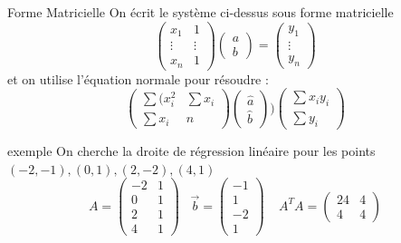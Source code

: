         \begin{parag}{Forme Matricielle}
            On écrit le système ci-dessus sous forme matricielle 
            \[\begin{pmatrix}
                x_1  & 1 \\ \vdots & \vdots \\ x_n & 1
            \end{pmatrix}\begin{pmatrix}
                a \\ b
            \end{pmatrix} = \begin{pmatrix}
                y_1 \\ \vdots \\ y_n
            \end{pmatrix}\]
            et on utilise l'équation normale pour résoudre :
            \[\begin{pmatrix}
                \sum (x_i^2 & \sum x_i\\
                \sum x_i & n
            \end{pmatrix}\begin{pmatrix}
                \hat{a}\\ \hat{b}
            \end{pmatrix} ) \begin{pmatrix}
                \sum x_iy_i \\ \sum y_i
            \end{pmatrix}\]
            \begin{subparag}{exemple}
                On cherche la droite de régression linéaire pour les points $(-2, -1), (0, 1), (2, -2), (4, 1)$
                \[A  = \begin{pmatrix}
                    -2 & 1 \\ 0 & 1 \\ 2 & 1 \\ 4 & 1
                \end{pmatrix} \; \; \; \vec{b} = \begin{pmatrix}
                    -1 \\ 1 \\-2\\ 1
                \end{pmatrix} \; \; \; \; A^T A= \begin{pmatrix}
                    24 & 4 \\ 4 & 4
                \end{pmatrix}\]
                \begin{align*}

\end{align*}
\end{subparag}
\end{parag}
